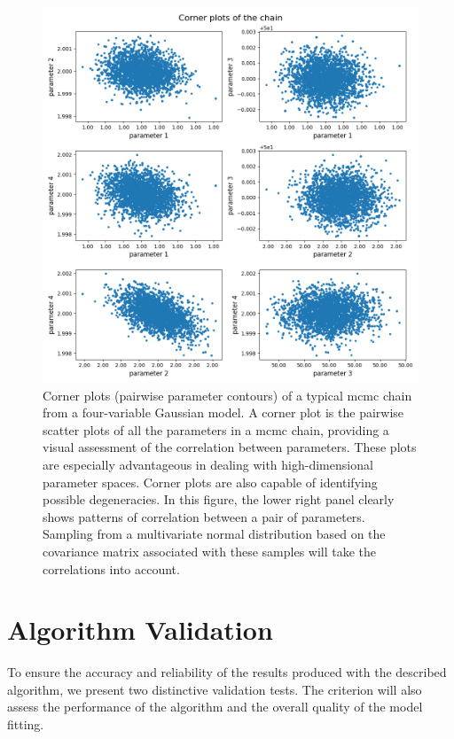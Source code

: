 \documentclass[12pt, TexShade, letterpaper]{report}
\begin{document}
\begin{figure}[h!]
\centering
\includegraphics[scale =0.6]{corner_plots.png}
\caption[Corner plots of an \gls{mcmc} chain]{Corner plots (pairwise parameter contours) of a typical \gls{mcmc} chain from a four-variable Gaussian model. 
 A corner plot is the pairwise scatter plots of all the parameters in a \gls{mcmc} chain, providing a visual assessment of the correlation between parameters. These plots are especially advantageous in dealing with high-dimensional parameter spaces. Corner plots are also capable of identifying possible degeneracies. In this figure, the lower right panel clearly shows patterns of correlation between a pair of parameters. Sampling from a multivariate normal distribution based on the covariance matrix associated with these samples will take the correlations into account.}
\label{fig:corner_plots}
\end{figure}
\section{Algorithm Validation}
\label{chap:method,sub:test}
To ensure the accuracy and reliability of the results produced with the described algorithm, we present two distinctive validation tests. The criterion will also assess the performance of the algorithm and the overall quality of the model fitting.\par
\end{document}
